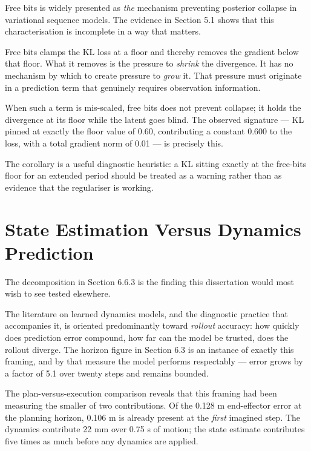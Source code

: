 \documentclass[12pt,a4paper,oneside]{report}
\begin{document}
Free bits is widely presented as \emph{the} mechanism preventing posterior collapse in
variational sequence models. The evidence in Section 5.1 shows that this
characterisation is incomplete in a way that matters.

Free bits clamps the KL loss at a floor and thereby removes the gradient below
that floor. What it removes is the pressure to \emph{shrink} the divergence. It has no
mechanism by which to create pressure to \emph{grow} it. That pressure must originate
in a prediction term that genuinely requires observation information.

When such a term is mis-scaled, free bits does not prevent collapse; it holds
the divergence at its floor while the latent goes blind. The observed signature
--- KL pinned at exactly the floor value of 0.60, contributing a constant 0.600 to
the loss, with a total gradient norm of 0.01 --- is precisely this.

The corollary is a useful diagnostic heuristic: a KL sitting exactly at the
free-bits floor for an extended period should be treated as a warning rather than
as evidence that the regulariser is working.

\hypertarget{state-estimation-versus-dynamics-prediction}{%
\section{State Estimation Versus Dynamics Prediction}\label{state-estimation-versus-dynamics-prediction}}

The decomposition in Section 6.6.3 is the finding this dissertation would most
wish to see tested elsewhere.

The literature on learned dynamics models, and the diagnostic practice that
accompanies it, is oriented predominantly toward \emph{rollout} accuracy: how quickly
does prediction error compound, how far can the model be trusted, does the
rollout diverge. The horizon figure in Section 6.3 is an instance of exactly this
framing, and by that measure the model performs respectably --- error grows by a
factor of 5.1 over twenty steps and remains bounded.

The plan-versus-execution comparison reveals that this framing had been measuring
the smaller of two contributions. Of the 0.128 m end-effector error at the
planning horizon, 0.106 m is already present at the \emph{first} imagined step. The
dynamics contribute 22 mm over 0.75 s of motion; the state estimate contributes
five times as much before any dynamics are applied.
\end{document}
